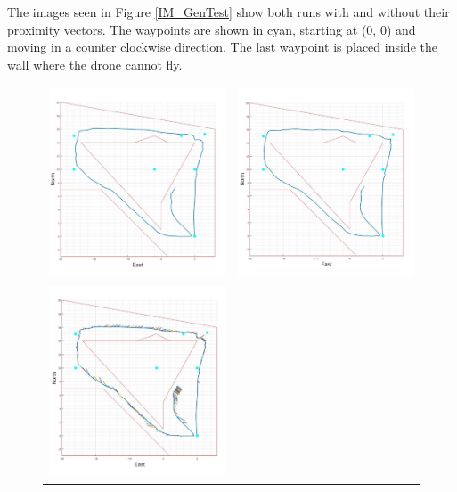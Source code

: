 		The images seen in Figure \ref{IM_GenTest} show both runs with and without their proximity vectors. The waypoints are shown in cyan, starting at (0, 0) and moving in a counter clockwise direction. The last waypoint is placed inside the wall where the drone cannot fly. 
		
		\begin{figure}[H]
			\begin{tabular}{c c}
				\centering
				{\includegraphics[width = 3in]{../References/Testing/FullRun.jpg}} &
				{\includegraphics[width = 3in]{../References/Testing/FullRunAlign.jpg}}\\
				{\includegraphics[width = 3in]{../References/Testing/FullRunProx.jpg}} &

\end{tabular}
\end{figure}
